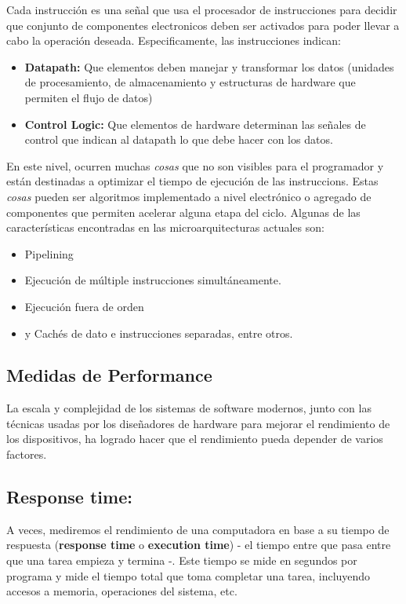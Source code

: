 Cada instrucción es una señal que usa el procesador de instrucciones para decidir que conjunto de componentes electronicos deben ser activados para poder llevar a cabo la operación deseada. Especificamente, las instrucciones indican: 

\begin{itemize}
	\item \textbf{Datapath:} Que elementos deben manejar y transformar los datos (unidades de procesamiento, de almacenamiento y estructuras de hardware que permiten el flujo de datos)
	\item \textbf{Control Logic:} Que elementos de hardware determinan las señales de control que indican al datapath lo que debe hacer con los datos.
\end{itemize}

En este nivel, ocurren muchas \textit{cosas} que no son visibles para el programador y están destinadas a optimizar el tiempo de ejecución de las instruccions. Estas \textit{cosas} pueden ser algoritmos implementado a nivel electrónico o agregado de componentes que permiten acelerar alguna etapa del ciclo. Algunas de las características encontradas en las microarquitecturas actuales son:

\begin{itemize}
	\item Pipelining
	\item Ejecución de múltiple instrucciones simultáneamente.
	\item Ejecución fuera de orden
	\item y Cachés de dato e instrucciones separadas, entre otros.
\end{itemize}

\subsection{Medidas de Performance}
La escala y complejidad de los sistemas de software modernos, junto con las técnicas usadas por los diseñadores de hardware para mejorar el rendimiento de los dispositivos, ha logrado hacer que el rendimiento pueda depender de varios factores.

\subsection{Response time:}
A veces, mediremos el rendimiento de una computadora en base a su tiempo de respuesta (\textbf{response time} o \textbf{execution time}) - el tiempo entre que pasa entre que una tarea empieza y termina -. Este tiempo se mide en segundos por programa y mide el tiempo total que toma completar una tarea, incluyendo accesos a memoria, operaciones del sistema, etc.

